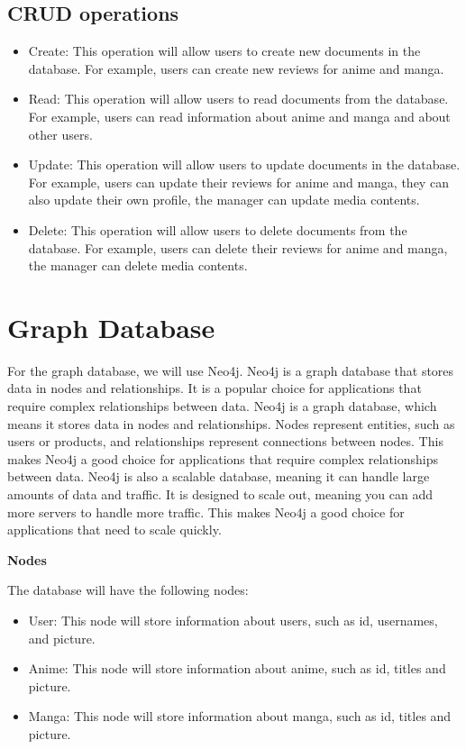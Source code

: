 \subsection {CRUD operations}
\begin{itemize}
    \item Create: This operation will allow users to create new documents in the database. For example, users can create new reviews for anime and manga.
    \item Read: This operation will allow users to read documents from the database. For example, users can read information about anime and manga and about other users.
    \item Update: This operation will allow users to update documents in the database. For example, users can update their reviews for anime and manga, they can also update their own profile, the manager can update media contents.
    \item Delete: This operation will allow users to delete documents from the database. For example, users can delete their reviews for anime and manga, the manager can delete media contents.
\end{itemize}

\newpage
\section{Graph Database}
For the graph database, we will use Neo4j. Neo4j is a graph database that stores data in nodes and relationships. It is a popular choice for applications that require complex relationships between data. Neo4j is a graph database, which means it stores data in nodes and relationships. Nodes represent entities, such as users or products, and relationships represent connections between nodes. This makes Neo4j a good choice for applications that require complex relationships between data. Neo4j is also a scalable database, meaning it can handle large amounts of data and traffic. It is designed to scale out, meaning you can add more servers to handle more traffic. This makes Neo4j a good choice for applications that need to scale quickly.

\textbf{Nodes}

The database will have the following nodes:
\begin{itemize}
    \item User: This node will store information about users, such as id, usernames, and picture.
    \item Anime: This node will store information about anime, such as id, titles and picture.
    \item Manga: This node will store information about manga, such as id, titles and picture.
\end{itemize}

